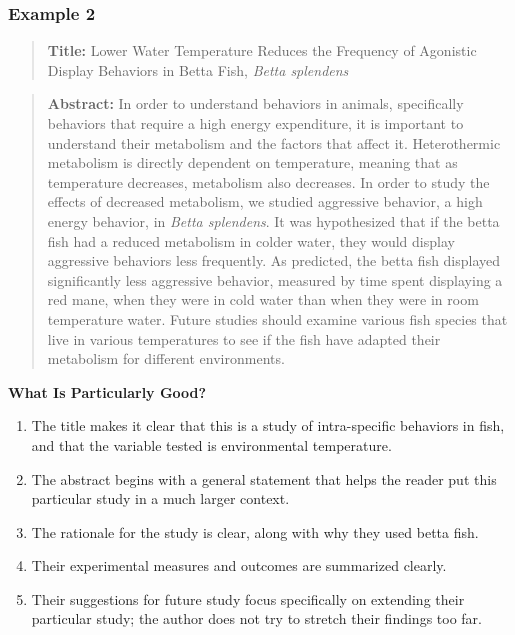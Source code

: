 \documentclass[
]{book}
\providecommand{\tightlist}{%
  \setlength{\itemsep}{0pt}\setlength{\parskip}{0pt}}
\begin{document}
\hypertarget{example-2-1}{%
\subsubsection{Example 2}\label{example-2-1}}

\begin{quote}
\textbf{Title:} Lower Water Temperature Reduces the Frequency of Agonistic Display Behaviors in Betta Fish, \emph{Betta splendens}
\end{quote}

\begin{quote}
\textbf{Abstract:} In order to understand behaviors in animals, specifically behaviors that require a high energy expenditure, it is important to understand their metabolism and the factors that affect it. Heterothermic metabolism is directly dependent on temperature, meaning that as temperature decreases, metabolism also decreases. In order to study the effects of decreased metabolism, we studied aggressive behavior, a high energy behavior, in \emph{Betta splendens}. It was hypothesized that if the betta fish had a reduced metabolism in colder water, they would display aggressive behaviors less frequently. As predicted, the betta fish displayed significantly less aggressive behavior, measured by time spent displaying a red mane, when they were in cold water than when they were in room temperature water. Future studies should examine various fish species that live in various temperatures to see if the fish have adapted their metabolism for different environments.
\end{quote}

\textbf{What Is Particularly Good?}

\begin{enumerate}
\def\labelenumi{\arabic{enumi}.}
\tightlist
\item
  The title makes it clear that this is a study of intra-specific behaviors in fish, and that the variable tested is environmental temperature.
\item
  The abstract begins with a general statement that helps the reader put this particular study in a much larger context.
\item
  The rationale for the study is clear, along with why they used betta fish.
\item
  Their experimental measures and outcomes are summarized clearly.
\item
  Their suggestions for future study focus specifically on extending their particular study; the author does not try to stretch their findings too far.
\end{enumerate}
\end{document}
